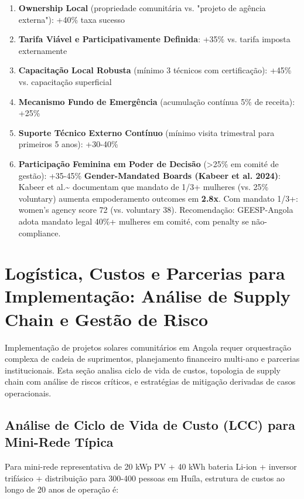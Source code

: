 \documentclass[12pt, a4paper]{article}
\begin{document}
\begin{enumerate}
\item\textbf{Ownership Local} (propriedade comunitária vs. "projeto de agência externa"): +40\% taxa sucesso
\item\textbf{Tarifa Viável e Participativamente Definida}: +35\% vs. tarifa imposta externamente
\item\textbf{Capacitação Local Robusta} (mínimo 3 técnicos com certificação): +45\% vs. capacitação superficial
\item\textbf{Mecanismo Fundo de Emergência} (acumulação contínua 5\% de receita): +25\%
\item\textbf{Suporte Técnico Externo Contínuo} (mínimo visita trimestral para primeiros 5 anos): +30-40\%
\item
\textbf{Participação Feminina em Poder de Decisão} (>25\% em comité de gestão): +35-45\%
\textbf{Gender-Mandated Boards (Kabeer et al. 2024)}: Kabeer et al.\textasciitilde{}\citep{Kabeer2024} documentam que mandato de 1/3+ mulheres (vs. 25\% voluntary) aumenta empoderamento outcomes em
\textbf{2.8x}. Com mandato 1/3+: women's agency score 72 (vs. voluntary 38). Recomendação: GEESP-Angola adota mandato legal 40\%+ mulheres em comité, com penalty se não-compliance.
\end{enumerate}



\section{Logística, Custos e Parcerias para Implementação: Análise de Supply Chain e Gestão de Risco}

Implementação de projetos solares comunitários em Angola requer orquestração complexa de cadeia de suprimentos, planejamento financeiro multi-ano e parcerias institucionais. Esta seção analisa ciclo de vida de custos, topologia de supply chain com análise de riscos críticos, e estratégias de mitigação derivadas de casos operacionais.

\subsection{Análise de Ciclo de Vida de Custo (LCC) para Mini-Rede Típica}

Para mini-rede representativa de 20 kWp PV + 40 kWh bateria Li-ion + inversor trifásico + distribuição para 300-400 pessoas em Huíla, estrutura de custos ao longo de 20 anos de operação é:
\end{document}

